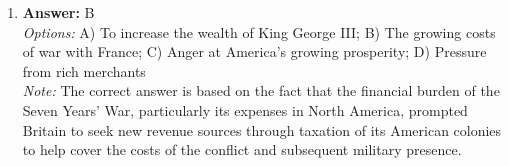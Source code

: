 \documentclass[12pt]{article}
\begin{document}
\begin{enumerate}[label=\arabic*.]
\\ \textit{Note:} The George W. Bush administration shifted U.S. foreign policy by adopting a unilateral approach that often criticized and sidelined international organizations, such as the United Nations, in favor of pursuing American interests independently, as exemplified by the decision to invade Iraq without broad international support.
\item \textbf{Answer:} B
\\ \textit{Options:} A) To increase the wealth of King George III; B) The growing costs of war with France; C) Anger at America's growing prosperity; D) Pressure from rich merchants
\\ \textit{Note:} The correct answer is based on the fact that the financial burden of the Seven Years' War, particularly its expenses in North America, prompted Britain to seek new revenue sources through taxation of its American colonies to help cover the costs of the conflict and subsequent military presence.
\end{enumerate}
\end{document}
